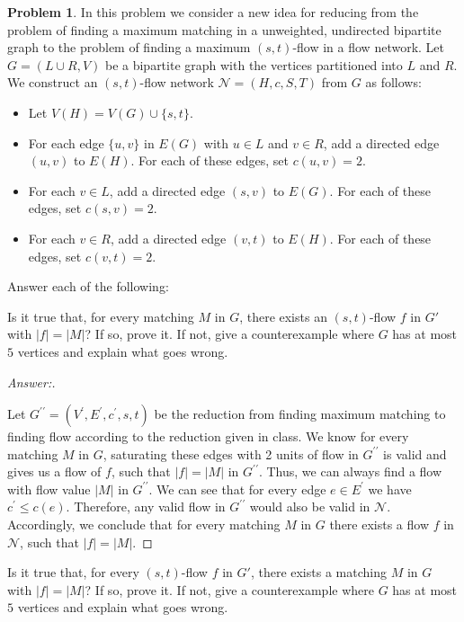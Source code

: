 \documentclass[11pt]{article}
\theoremstyle{definition}
\theoremstyle{definition}
\newtheorem{required}{Problem}
\theoremstyle{definition}
\begin{document}
\begin{required} \label{Problem2}
In this problem we consider a new idea for reducing from the problem of finding a maximum matching in a unweighted, undirected bipartite graph to the problem of finding a maximum $(s,t)$-flow in a flow network.
Let $G = (L \cup R, V)$ be a bipartite graph with the vertices partitioned into $L$ and $R$.
We construct an $(s,t)$-flow network $\mathcal{N} = (H, c, S, T)$ from $G$ as follows:
\begin{itemize}
	\item Let $V(H) = V(G) \cup \{s,t\}$.
	\item For each edge $\{u,v\}$ in $E(G)$ with $u \in L$ and $v \in R$, add a directed edge $(u,v)$ to $E(H)$. For each of these edges, set $c(u,v)=2$.
	\item For each $v \in L$, add a directed edge $(s,v)$ to $E(G)$. For each of these edges, set $c(s,v) = 2$.
	\item For each $v \in R$, add a directed edge $(v,t)$ to $E(H)$. For each of these edges, set $c(v,t) = 2$.
\end{itemize}

Answer each of the following:
\begin{enumerate}[label=(\alph*)]
\item Is it true that, for every matching $M$ in $G$, there exists an $(s,t)$-flow $f$ in $G'$ with $|f| = |M|$?
If so, prove it.
If not, give a counterexample where $G$ has at most $5$ vertices and explain what goes wrong. 

\begin{proof}[Answer:] \
\item Let $G^{\prime\prime} = (V^{\prime}, E^{\prime}, c^{\prime}, s, t)$ be the reduction from finding maximum matching to finding flow according to the reduction given in class. We know for every matching $M$ in $G$, saturating these edges with 2 units of flow in $G^{\prime\prime}$ is valid and gives us a flow of $f$, such that $|f| = |M|$ in $G^{\prime\prime}$. Thus, we can always find a flow with flow value $|M|$ in $G^{\prime\prime}$. We can see that for every edge $e \in E^{\prime}$ we have $c^{\prime} \leq c(e)$. Therefore, any valid flow in $G^{\prime\prime}$ would also be valid in $\mathcal{N}$. Accordingly, we conclude that for every matching $M$ in $G$ there exists a flow $f$ in $\mathcal{N}$, such that $|f| = |M|$.
\end{proof}


\vskip 15pt
\item Is it true that, for every $(s,t)$-flow $f$ in $G'$, there exists a matching $M$ in $G$ with $|f| = |M|$?
If so, prove it.
If not, give a counterexample where $G$ has at most $5$ vertices and explain what goes wrong. 


\end{enumerate}
\end{required}
\end{document}
